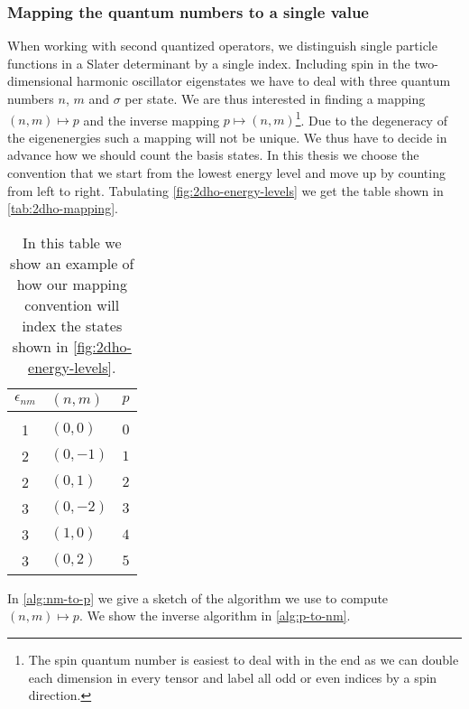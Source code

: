         \subsubsection{Mapping the quantum numbers to a single value}
            When working with second quantized operators, we distinguish single
            particle functions in a Slater determinant by a single index.
            Including spin in the two-dimensional harmonic oscillator
            eigenstates we have to deal with three quantum numbers $n$, $m$ and
            $\sigma$ per state.  We are thus interested in finding a mapping
            $(n, m) \mapsto p$ and the inverse mapping $p \mapsto (n,
            m)$\footnote{The spin quantum number is easiest to deal with in the
            end as we can double each dimension in every tensor and label all
            odd or even indices by a spin direction.}.  Due to the degeneracy of
            the eigenenergies such a mapping will not be unique. We thus have to
            decide in advance how we should count the basis states. In this
            thesis we choose the convention that we start from the lowest energy
            level and move up by counting from left to right. Tabulating
            \autoref{fig:2dho-energy-levels} we get the table shown in
            \autoref{tab:2dho-mapping}.
            \begin{table}
                \centering
                \caption{In this table we show an example of how our mapping
                convention will index the states shown in
                \autoref{fig:2dho-energy-levels}.}
                \begin{tabular}{c|ll}
                    $\epsilon_{nm}$ & $(n, m)$ & $p$ \\
                    \hline
                    \\
                    1 & $(0, 0)$ & $0$ \\
                    2 & $(0, -1)$ & $1$ \\
                    2 & $(0, 1)$ & $2$ \\
                    3 & $(0, -2)$ & $3$ \\
                    3 & $(1, 0)$ & $4$ \\
                    3 & $(0, 2)$ & $5$
                \end{tabular}
                \label{tab:2dho-mapping}
            \end{table}
            In \autoref{alg:nm-to-p} we give a sketch of the algorithm we use
            to compute $(n, m) \mapsto p$. We show the inverse algorithm in
            \autoref{alg:p-to-nm}.

